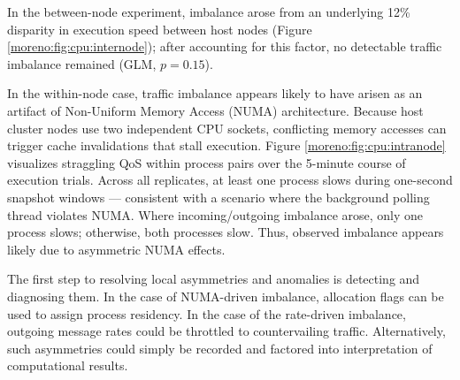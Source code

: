 In the between-node experiment, imbalance arose from an underlying 12\% disparity in execution speed between host nodes (Figure \ref{moreno:fig:cpu:internode}); after accounting for this factor, no detectable traffic imbalance remained (GLM, $p = 0.15$).

In the within-node case, traffic imbalance appears likely to have arisen as an artifact of Non-Uniform Memory Access (NUMA) architecture.
Because host cluster nodes use two independent CPU sockets, conflicting memory accesses can trigger cache invalidations that stall execution.
Figure \ref{moreno:fig:cpu:intranode} visualizes straggling QoS within process pairs over the 5-minute course of execution trials.
Across all replicates, at least one process slows during one-second snapshot windows --- consistent with a scenario where the background polling thread violates NUMA.
Where incoming/outgoing imbalance arose, only one process slows; otherwise, both processes slow.
Thus, observed imbalance appears likely due to asymmetric NUMA effects.

The first step to resolving local asymmetries and anomalies is detecting and diagnosing them.
In the case of NUMA-driven imbalance, allocation flags can be used to assign process residency.
In the case of the rate-driven imbalance, outgoing message rates could be throttled to countervailing traffic.
Alternatively, such asymmetries could simply be recorded and factored into interpretation of computational results.
